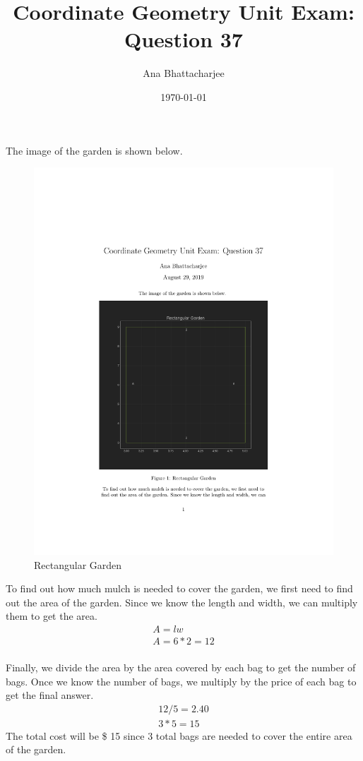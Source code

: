 \documentclass{article}
\begin{document}
\title{Coordinate Geometry Unit Exam: Question 37}
\author{Ana Bhattacharjee}
\date{\today}
\maketitle{}

\begin{center}
  The image of the garden is shown below.
  \begin{figure}[!htbp]
    \includegraphics[width=1.0\columnwidth]{q37}
    \caption{Rectangular Garden}
  \end{figure}
  \par
  To find out how much mulch is needed to cover the garden, we first need to find out the area of the garden. Since we know the length and width, we can multiply them to get the area.
  \begin{align}
    A = lw \\
    A = 6 * 2 = 12 \\
  \end{align}
  \par
  Finally, we divide the area by the area covered by each bag to get the number of bags. Once we know the number of bags, we multiply by the price of each bag to get the final answer.
  \begin{align}
    12 / 5 = 2.40 \\
    3 * 5 = 15
  \end{align}
  The total cost will be \$ 15 since 3 total bags are needed to cover the entire area of the garden.
\end{center}
\end{document}
